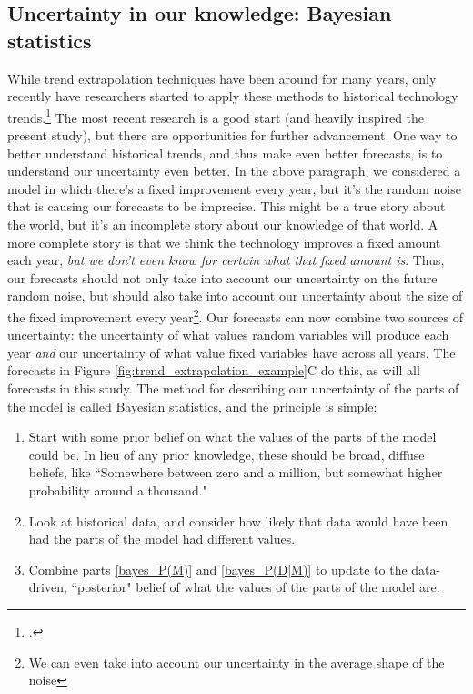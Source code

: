 \documentclass{article}
\begin{document}
\subsection{Uncertainty in our knowledge: Bayesian statistics}
While trend extrapolation techniques have been around for many years, only recently have researchers started to apply these methods to historical technology trends.\footcite{Farmer2016} The most recent research is a good start (and heavily inspired the present study), but there are opportunities for further advancement. One way to better understand historical trends, and thus make even better forecasts, is to understand our uncertainty even better. In the above paragraph, we considered a model in which there's a fixed improvement every year, but it's the random noise that is causing our forecasts to be imprecise. This might be a true story about the world, but it's an incomplete story about our knowledge of that world. A more complete story is that we think the technology improves a fixed amount each year, \textit{but we don't even know for certain what that fixed amount is}. Thus, our forecasts should not only take into account our uncertainty on the future random noise, but should also take into account our uncertainty about the size of the fixed improvement every year\footnote{We can even take into account our uncertainty in the average shape of the noise}. Our forecasts can now combine two sources of uncertainty: the uncertainty of what values random variables will produce each year \textit{and} our uncertainty of what value fixed variables have across all years. The forecasts in Figure \ref{fig:trend_extrapolation_example}C do this, as will all forecasts in this study. The method for describing our uncertainty of the parts of the model is called Bayesian statistics, and the principle is simple: 
\begin{enumerate}
    \item Start with some prior belief on what the values of the parts of the model could be. In lieu of any prior knowledge, these should be broad, diffuse beliefs, like ``Somewhere between zero and a million, but somewhat higher probability around a thousand."\label{bayes_P(M)}
    \item Look at historical data, and consider how likely that data would have been had the parts of the model had different values\label{bayes_P(D|M)}.
    \item Combine parts \ref{bayes_P(M)} and \ref{bayes_P(D|M)} to update to the data-driven, ``posterior" belief of what the values of the parts of the model are.
\end{enumerate}
\end{document}
